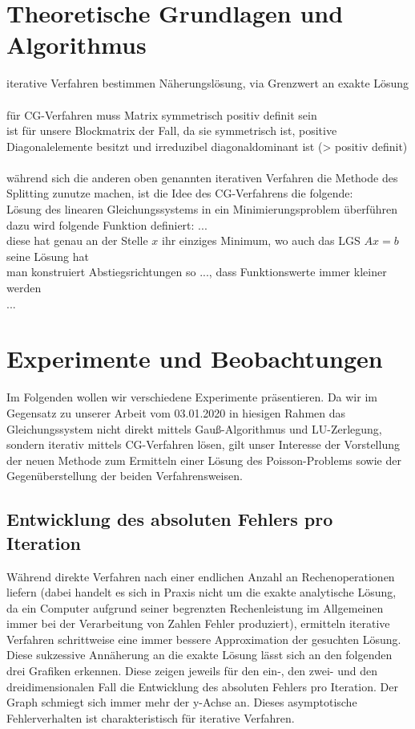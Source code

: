 \documentclass{scrartcl}
\begin{document}
\section{Theoretische Grundlagen und Algorithmus}
iterative Verfahren bestimmen Näherungslösung, via Grenzwert an exakte Lösung \\
\\
für CG-Verfahren muss Matrix symmetrisch positiv definit sein \\
ist für unsere Blockmatrix der Fall, da sie symmetrisch ist, positive Diagonalelemente besitzt und irreduzibel diagonaldominant ist (> positiv definit) \\
\\
während sich die anderen oben genannten iterativen Verfahren die Methode des Splitting zunutze machen, ist die Idee des CG-Verfahrens die folgende: \\
Lösung des linearen Gleichungssystems in ein Minimierungsproblem überführen \\
dazu wird folgende Funktion definiert: ... \\
diese hat genau an der Stelle $x$ ihr einziges Minimum, wo auch das LGS $Ax=b$ seine Lösung hat \\
man konstruiert Abstiegsrichtungen so ..., dass Funktionswerte immer kleiner werden \\
...

\pagebreak
\section{Experimente und Beobachtungen}
Im Folgenden wollen wir verschiedene Experimente präsentieren. 
Da wir im Gegensatz zu unserer Arbeit vom 03.01.2020 in hiesigen Rahmen das Gleichungssystem nicht direkt mittels Gauß-Algorithmus und LU-Zerlegung, sondern iterativ mittels CG-Verfahren lösen, gilt unser Interesse der Vorstellung der neuen Methode zum Ermitteln einer Lösung des Poisson-Problems sowie der Gegenüberstellung der beiden Verfahrensweisen.  


\subsection{Entwicklung des absoluten Fehlers pro Iteration}
Während direkte Verfahren nach einer endlichen Anzahl an Rechenoperationen \grqq{} liefern (dabei handelt es sich in Praxis nicht um die exakte analytische Lösung, da ein Computer aufgrund seiner begrenzten Rechenleistung im Allgemeinen immer bei der Verarbeitung von Zahlen Fehler produziert), ermitteln iterative Verfahren schrittweise eine immer bessere Approximation der gesuchten Lösung. \\ 
Diese sukzessive Annäherung an die exakte Lösung lässt sich an den folgenden drei Grafiken erkennen. 
Diese zeigen jeweils für den ein-, den zwei- und den dreidimensionalen Fall die Entwicklung des absoluten Fehlers pro Iteration. 
Der Graph schmiegt sich immer mehr der y-Achse an. 
Dieses asymptotische Fehlerverhalten ist charakteristisch für iterative Verfahren. \\
\end{document}
